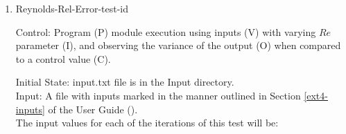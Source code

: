\documentclass[12pt, titlepage]{article}
\newcommand{\famname}{Lattice Boltzmann Solver}
\newcounter{testcounter} %
\begin{document}
\begin{enumerate}
How test will be performed:

\begin{enumerate}
\item The Von Karman Vortex Street module shall be modified by the author to
  print the vorticity vector as output.
\item Outside of the system, the input parameter values will be written to a text file titled input.txt, as outlined in Section \ref{ext4-inputs} of the User Guide.
\item The file will be placed into the Input directory, under the home directory
  of the project.
\item {\famname} shall be run.  
\item Upon completion of the module, the output values of the vorticity vector
  will be compared to the vorticity vector values from pyLBM - comparison will
  be done per cell. Comparisons can be done manually using Excel, or through a
  script, using the equation for relative error found in Section \ref{eqerror}.
\end{enumerate}


\item{Reynolds-Rel-Error-test-id\thetestcounter \\}

Control: Program (P) module execution using inputs (V) with varying $Re$
parameter (I), and observing the variance of the output (O) when compared to a control value (C).  %
				
					
Initial State: input.txt file is in the Input directory.\\
					
Input: A file with inputs marked in the manner outlined in Section \ref{ext4-inputs} of the User Guide (\citet{LBM_UserGuide_PM}).\\The input values for each of the iterations of this test will be:\\


\end{enumerate}
\end{document}
